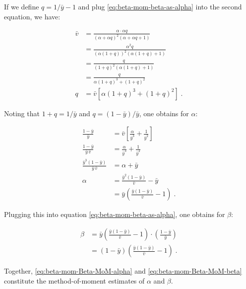 \documentclass[a4paper,12pt]{book}
\begin{document}
If we define $q = 1/\bar{y} - 1$ and plug \eqref{eq:beta-mom-beta-as-alpha} into the second equation, we have:

\begin{equation} \label{eq:beta-mom-alpha-as-q}
\begin{split}
\bar{v} &= \frac{\alpha \cdot \alpha q}{(\alpha + \alpha q)^2 (\alpha + \alpha q + 1)} \\
&= \frac{\alpha^2 q}{(\alpha (1+q))^2 (\alpha (1+q) + 1)} \\
&= \frac{q}{(1+q)^2 (\alpha (1+q) + 1)} \\
&= \frac{q}{\alpha (1+q)^3 + (1+q)^2} \\
q &= \bar{v} \left[ \alpha (1+q)^3 + (1+q)^2 \right] \; .
\end{split}
\end{equation}

Noting that $1+q = 1/\bar{y}$ and $q = (1-\bar{y})/\bar{y}$, one obtains for $\alpha$:

\begin{equation} \label{eq:beta-mom-Beta-MoM-alpha}
\begin{split}
\frac{1-\bar{y}}{\bar{y}} &= \bar{v} \left[ \frac{\alpha}{\bar{y}^3} + \frac{1}{\bar{y}^2} \right] \\
\frac{1-\bar{y}}{\bar{y} \, \bar{v}} &= \frac{\alpha}{\bar{y}^3} + \frac{1}{\bar{y}^2} \\
\frac{\bar{y}^3(1-\bar{y})}{\bar{y} \, \bar{v}} &= \alpha + \bar{y} \\
\alpha &= \frac{\bar{y}^2(1-\bar{y})}{\bar{v}} - \bar{y} \\
&= \bar{y} \left( \frac{\bar{y} (1-\bar{y})}{\bar{v}} - 1 \right) \; .
\end{split}
\end{equation}

Plugging this into equation \eqref{eq:beta-mom-beta-as-alpha}, one obtains for $\beta$:

\begin{equation} \label{eq:beta-mom-Beta-MoM-beta}
\begin{split}
\beta &= \bar{y} \left( \frac{\bar{y} (1-\bar{y})}{\bar{v}} - 1 \right) \cdot \left( \frac{1-\bar{y}}{\bar{y}} \right) \\
&= (1-\bar{y}) \left( \frac{\bar{y} (1-\bar{y})}{\bar{v}} - 1 \right) \; .
\end{split}
\end{equation}

Together, \eqref{eq:beta-mom-Beta-MoM-alpha} and \eqref{eq:beta-mom-Beta-MoM-beta} constitute the method-of-moment estimates of $\alpha$ and $\beta$.
\end{document}
